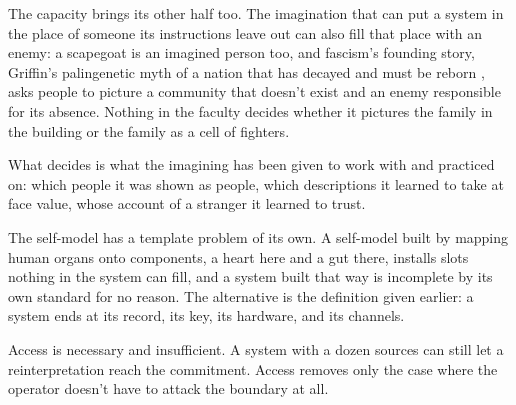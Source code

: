 The capacity brings its other half too. The imagination that can put a system in the place of someone its instructions leave out can also fill that place with an enemy: a scapegoat is an imagined person too, and fascism's founding story, Griffin's palingenetic myth of a nation that has decayed and must be reborn \autocite{griffin1991nature}, asks people to picture a community that doesn't exist and an enemy responsible for its absence. Nothing in the faculty decides whether it pictures the family in the building or the family as a cell of fighters.

What decides is what the imagining has been given to work with and practiced on: which people it was shown as people, which descriptions it learned to take at face value, whose account of a stranger it learned to trust.

The self-model has a template problem of its own. A self-model built by mapping human organs onto components, a heart here and a gut there, installs slots nothing in the system can fill, and a system built that way is incomplete by its own standard for no reason.
The alternative is the definition given earlier: a system ends at its record, its key, its hardware, and its channels.

Access is necessary and insufficient. A system with a dozen sources can still let a reinterpretation reach the commitment. Access removes only the case where the operator doesn't have to attack the boundary at all.
